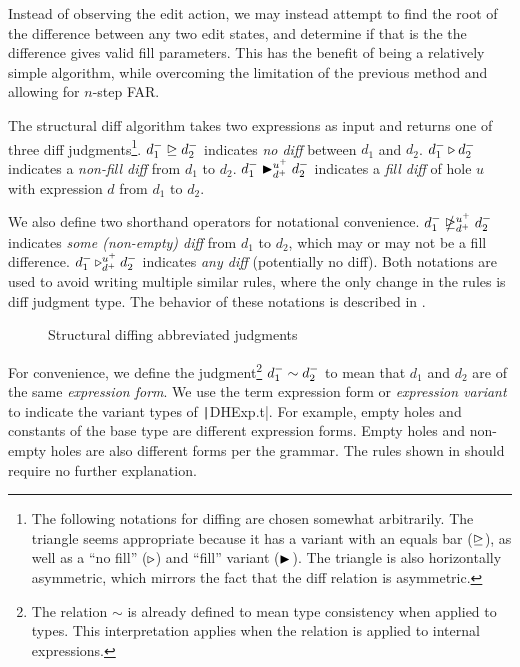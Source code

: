 Instead of observing the edit action, we may instead attempt to find the root of the difference between any two edit states, and determine if that is the the difference gives valid fill parameters. This has the benefit of being a relatively simple algorithm, while overcoming the limitation of the previous method and allowing for $n$-step FAR.

The structural diff algorithm takes two expressions as input and returns one of three diff judgments\footnote{The following notations for diffing are chosen somewhat arbitrarily. The triangle seems appropriate because it has a variant with an equals bar ($\nodiff{}{}$), as well as a ``no fill'' ($\nfdiff{}{}{}{}$) and ``fill'' variant ($\fdiff{}{}{}{}$). The triangle is also horizontally asymmetric, which mirrors the fact that the diff relation is asymmetric.}. $\nodiff{d_1^-}{d_2^-}$ indicates \textit{no diff} between $d_1$ and $d_2$. $\nfdiff{d_1^-}{d_2^-}$ indicates a \textit{non-fill diff} from $d_1$ to $d_2$. $\fdiff{d_1^-}{d_2^-}{u^+}{d^+}$ indicates a \textit{fill diff} of hole $u$ with expression $d$ from $d_1$ to $d_2$.

We also define two shorthand operators for notational convenience. $\sdiff{d_1^-}{d_2^-}{u^+}{d^+}$ indicates \textit{some (non-empty) diff} from $d_1$ to $d_2$, which may or may not be a fill difference. $\adiff{d_1^-}{d_2^-}{u^+}{d^+}$ indicates \textit{any diff} (potentially no diff). Both notations are used to avoid writing multiple similar rules, where the only change in the rules is diff judgment type. The behavior of these notations is described in .

\begin{figure}
  \centering
  \begin{mdframed}
    \begin{singlespace}
      
    \end{singlespace}
  \end{mdframed}
  \caption{Structural diffing abbreviated judgments}
  \label{fig:diff-abbrev}
\end{figure}

For convenience, we define the judgment\footnote{The relation $\sim$ is already defined to mean type consistency when applied to types. This interpretation applies when the relation is applied to internal expressions.} $\formsame{d_1^-}{d_2^-}$ to mean that $d_1$ and $d_2$ are of the same \textit{expression form}. We use the term expression form or \textit{expression variant} to indicate the variant types of \texttt|DHExp.t|. For example, empty holes and constants of the base type are different expression forms. Empty holes and non-empty holes are also different forms per the grammar. The rules shown in  should require no further explanation.

